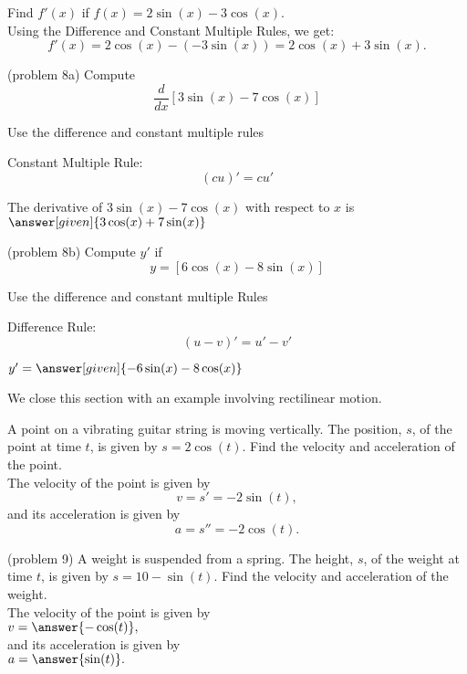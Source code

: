 \documentclass{ximera}
\begin{document}
\begin{example}[example 8]
 Find $f'(x)$ if  $f(x) = 2\sin(x) - 3\cos(x).$\\
 Using the Difference and Constant Multiple Rules, we get:
 \[
 f'(x) = 2\cos(x) - (-3\sin(x)) = 2\cos(x) + 3\sin(x).
 \]
\end{example}


\begin{problem}(problem 8a)
  Compute 
  \[
  \frac{d}{dx} \left[3\sin(x) - 7\cos(x)\right]
  \]
  
		\begin{hint}
      Use the difference and constant multiple rules
    \end{hint}
    \begin{hint}
      Constant Multiple Rule:
      \[
      (cu)' = cu'
      \]
    \end{hint}    
		The derivative of $3\sin(x) - 7\cos(x)$ with respect to $x$ is
		 $\answer[given]{3\cos(x) + 7\sin(x)}$
	
\end{problem}

\begin{problem}(problem 8b)
  Compute $y'$ if
  \[
  y= \left[6\cos(x) - 8\sin(x)\right]
  \]
  
		\begin{hint}
      Use the difference and constant multiple Rules
    \end{hint}
    \begin{hint}
      Difference Rule:
      \[
      (u-v)' = u' - v'
      \]
    \end{hint}    
		
  $y' = \answer[given]{-6\sin(x) - 8\cos(x)}$
	
\end{problem}

We close this section with an example involving rectilinear motion.

\begin{example}
A point on a vibrating guitar string is moving vertically.
The position, $s$, of the point at time $t$, is given by $s = 2\cos(t)$.  Find the velocity and acceleration of the point.\\
The velocity of the point is given by 
\[
v = s' = -2\sin(t),
\]
and its acceleration is given by 
\[
a = s'' = -2\cos(t).
\]

\end{example}

\begin{problem}(problem 9)
A weight is suspended from a spring.
The height, $s$, of the weight at time $t$, is given by $s = 10-\sin(t)$.  Find the velocity and acceleration of the weight.\\
The velocity of the point is given by\\
 $v = \answer{ -\cos(t)},$ \\
and its acceleration is given by\\
 $a = \answer{\sin(t)}.$
\end{problem}
\end{document}
